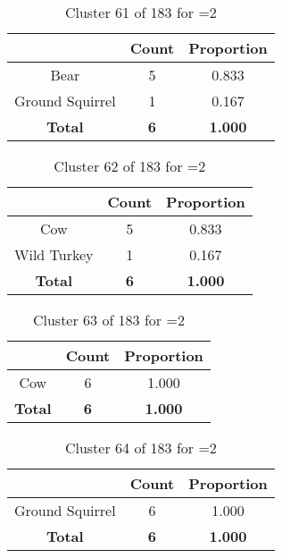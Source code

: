\begin{table}[ht!]
\centering
\begin{tabular}{|c|c|c|}
\hline
\bf \Spec{} &\bf Count &\bf Proportion\\ \hline \hline
Bear & 5 & 0.833\\ \hline
Ground Squirrel & 1 & 0.167\\ \hline
\hline
\bf Total & \bf 6 & \bf 1.000\\ \hline
\end{tabular}
\label{tab:cluster:61:2}
\caption{Cluster 61 of 183 for \minneigh{}=2}
\end{table}

\begin{table}[ht!]
\centering
\begin{tabular}{|c|c|c|}
\hline
\bf \Spec{} &\bf Count &\bf Proportion\\ \hline \hline
Cow & 5 & 0.833\\ \hline
Wild Turkey & 1 & 0.167\\ \hline
\hline
\bf Total & \bf 6 & \bf 1.000\\ \hline
\end{tabular}
\label{tab:cluster:62:2}
\caption{Cluster 62 of 183 for \minneigh{}=2}
\end{table}

\begin{table}[ht!]
\centering
\begin{tabular}{|c|c|c|}
\hline
\bf \Spec{} &\bf Count &\bf Proportion\\ \hline \hline
Cow & 6 & 1.000\\ \hline
\hline
\bf Total & \bf 6 & \bf 1.000\\ \hline
\end{tabular}
\label{tab:cluster:63:2}
\caption{Cluster 63 of 183 for \minneigh{}=2}
\end{table}

\begin{table}[ht!]
\centering
\begin{tabular}{|c|c|c|}
\hline
\bf \Spec{} &\bf Count &\bf Proportion\\ \hline \hline
Ground Squirrel & 6 & 1.000\\ \hline
\hline
\bf Total & \bf 6 & \bf 1.000\\ \hline
\end{tabular}
\label{tab:cluster:64:2}
\caption{Cluster 64 of 183 for \minneigh{}=2}
\end{table}

